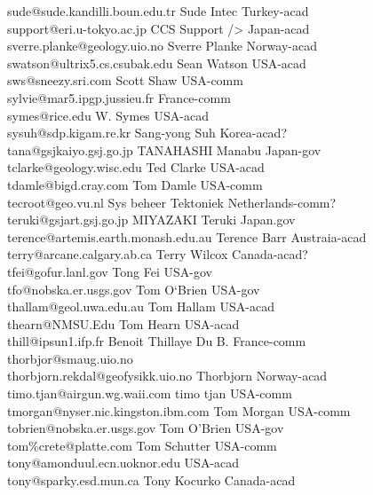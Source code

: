 \begin{tabbing}
sude@sude.kandilli.boun.edu.tr \> Sude Intec \> Turkey-acad\\
support@eri.u-tokyo.ac.jp \> CCS Support /> Japan-acad\\
sverre.planke@geology.uio.no \> Sverre Planke \> Norway-acad\\
swatson@ultrix5.cs.csubak.edu \> Sean Watson \> USA-acad\\
sws@sneezy.sri.com \> Scott Shaw \> USA-comm\\
sylvie@mar5.ipgp.jussieu.fr \> \> France-comm\\
symes@rice.edu  \>   W. Symes \> USA-acad\\
sysuh@sdp.kigam.re.kr \> Sang-yong Suh \> Korea-acad?\\
tana@gsjkaiyo.gsj.go.jp \>  TANAHASHI Manabu \> Japan-gov\\
tclarke@geology.wisc.edu \> Ted Clarke \> USA-acad\\
tdamle@bigd.cray.com \> Tom Damle \> USA-comm\\
tecroot@geo.vu.nl \> Sys beheer Tektoniek \> Netherlands-comm?\\
teruki@gsjart.gsj.go.jp \> MIYAZAKI Teruki \> Japan.gov\\
terence@artemis.earth.monash.edu.au  \> Terence Barr \> Austraia-acad\\
terry@arcane.calgary.ab.ca \>  Terry Wilcox \> Canada-acad?\\
tfei@gofur.lanl.gov \> Tong Fei \> USA-gov\\
tfo@nobska.er.usgs.gov \> Tom O`Brien \> USA-gov\\
thallam@geol.uwa.edu.au \> Tom Hallam \> USA-acad\\
thearn@NMSU.Edu   \> Tom Hearn \> USA-acad\\
thill@ipsun1.ifp.fr \> Benoit Thillaye Du B. \> France-comm\\
thorbjor@smaug.uio.no \> \> \\
thorbjorn.rekdal@geofysikk.uio.no \> Thorbjorn \>  Norway-acad\\
timo.tjan@airgun.wg.waii.com \> timo tjan \> USA-comm\\
tmorgan@nyser.nic.kingston.ibm.com \> Tom Morgan \> USA-comm\\
tobrien@nobska.er.usgs.gov \> Tom O'Brien \> USA-gov\\
tom\%crete@platte.com \>  Tom Schutter \> USA-comm\\
tony@amonduul.ecn.uoknor.edu \> \> USA-acad\\
tony@sparky.esd.mun.ca \>  Tony Kocurko \> Canada-acad\\

\end{tabbing}
